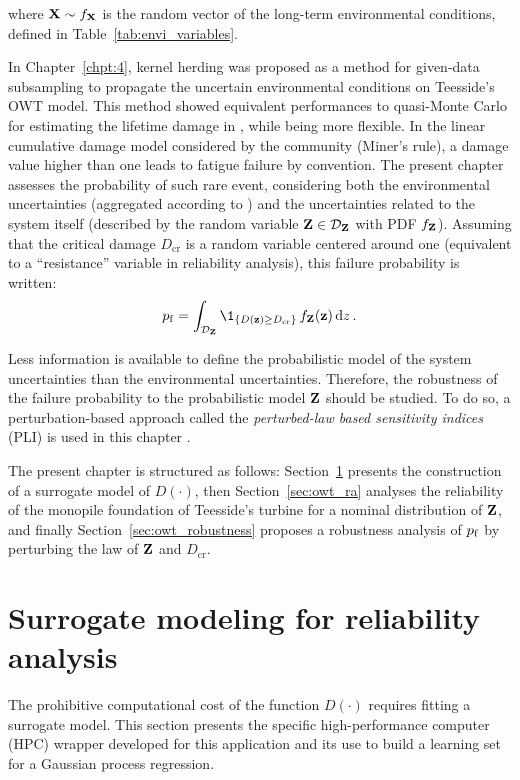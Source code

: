 where ${\bf X} \sim f_{\bf X}$ is the random vector of the long-term environmental conditions, defined in Table~\ref{tab:envi_variables}. 

In Chapter~\ref{chpt:4}, kernel herding was proposed as a method for given-data subsampling to propagate the uncertain environmental conditions on Teesside's OWT model. 
This method showed equivalent performances to quasi-Monte Carlo for estimating the lifetime damage in , while being more flexible. 
In the linear cumulative damage model considered by the community (Miner's rule), a damage value higher than one leads to fatigue failure by convention. 
The present chapter assesses the probability of such rare event, considering both the environmental uncertainties (aggregated according to ) and the uncertainties related to the system itself (described by the random variable ${\bf Z} \in \mathcal{D}_{\bf Z}$ with PDF $f_{\bf Z}$). 
Assuming that the critical damage $D_{\mathrm{cr}}$ is a random variable centered around one (equivalent to a ``resistance'' variable in reliability analysis), this failure probability is written:
\begin{equation}
    \pf = \int_{\iD_\bZ} \1_{\{D(\bz) \geq D_{\mathrm{cr}}\}} \, f_\bZ(\bz) \, \dd z \,.
    \label{eq:owt_pf}
\end{equation}

Less information is available to define the probabilistic model of the system uncertainties than the environmental uncertainties. 
Therefore, the robustness of the failure probability to the probabilistic model ${\bf Z}$ should be studied. 
To do so, a perturbation-based approach called the \textit{perturbed-law based sensitivity indices} (PLI) is used in this chapter \citep{lemaitre_2015_PLI}.   

The present chapter is structured as follows: 
Section~\ref{sec:owt_surrogate} presents the construction of a surrogate model of $D(\cdot)$,
then Section~\ref{sec:owt_ra} analyses the reliability of the monopile foundation of Teesside's turbine for a nominal distribution of ${\bf Z}$, 
and finally Section~\ref{sec:owt_robustness} proposes a robustness analysis of $p_\mathrm{f}$ by perturbing the law of ${\bf Z}$ and $D_{\mathrm{cr}}$.

\section{Surrogate modeling for reliability analysis}\label{sec:owt_surrogate}
The prohibitive computational cost of the function $D(\cdot)$ requires fitting a surrogate model.  
This section presents the specific high-performance computer (HPC) wrapper developed for this application and its use to build a learning set for a Gaussian process regression. 

